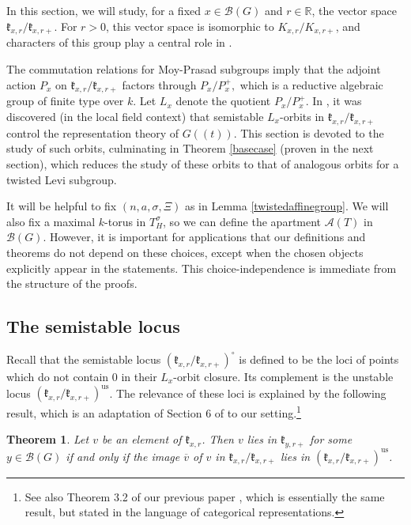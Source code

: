 \documentclass[12pt]{article}
\newcommand{\on}{\operatorname}
\newtheorem{theorem}{Theorem}[section]
\theoremstyle{remark}
\begin{document}
In this section, we will study, for a fixed $x\in\mathcal{B}(G)$ and $r\in\mathbb{R}$, the vector space $\mathfrak{k}_{x,r}/\mathfrak{k}_{x,r+}$. For $r>0$, this vector space is isomorphic to $K_{x,r}/K_{x,r+}$, and characters of this group play a central role in \cite{MP1}.

The commutation relations for Moy-Prasad subgroups imply that the adjoint action $P_x$ on $\mathfrak{k}_{x,r}/\mathfrak{k}_{x,r+}$ factors through $P_x/P_x^+,$ which is a reductive algebraic group of finite type over $k$. Let $L_x$ denote the quotient $P_x/P_x^+.$ In \cite{MP1}, it was discovered (in the local field context) that semistable $L_x$-orbits in $\mathfrak{k}_{x,r}/\mathfrak{k}_{x,r+}$ control the representation theory of $G((t))$. This section is devoted to the study of such orbits, culminating in Theorem \ref{basecase} (proven in the next section), which reduces the study of these orbits to that of analogous orbits for a twisted Levi subgroup.

It will be helpful to fix $(n,a,\sigma,\Xi)$ as in Lemma \ref{twistedaffinegroup}. We will also fix a maximal $k$-torus in $T_H^{\sigma}$, so we can define the apartment $\mathcal{A}(T)$ in $\mathcal{B}(G)$. However, it is important for applications that our definitions and theorems do not depend on these choices, except when the chosen objects explicitly appear in the statements. This choice-independence is immediate from the structure of the proofs.

\subsection{The semistable locus}

Recall that the semistable locus $(\mathfrak{k}_{x,r}/\mathfrak{k}_{x,r+})^{\circ}$ is defined to be the loci of points which do not contain $0$ in their $L_x$-orbit closure. Its complement is the unstable locus $(\mathfrak{k}_{x,r}/\mathfrak{k}_{x,r+})^{\on{us}}$. The relevance of these loci is explained by the following result, which is an adaptation of Section 6 of \cite{MP1} to our setting.\footnote{See also Theorem 3.2 of our previous paper \cite{yangMP}, which is essentially the same result, but stated in the language of categorical representations.}

\begin{theorem}\label{ssvsdepth}
Let $v$ be an element of $\mathfrak{k}_{x,r}$. Then $v$ lies in $\mathfrak{k}_{y,r+}$ for some $y\in\mathcal{B}(G)$ if and only if the image $\overline{v}$ of $v$ in $\mathfrak{k}_{x,r}/\mathfrak{k}_{x,r+}$ lies in $(\mathfrak{k}_{x,r}/\mathfrak{k}_{x,r+})^{\on{us}}$.
\end{theorem}
\end{document}
